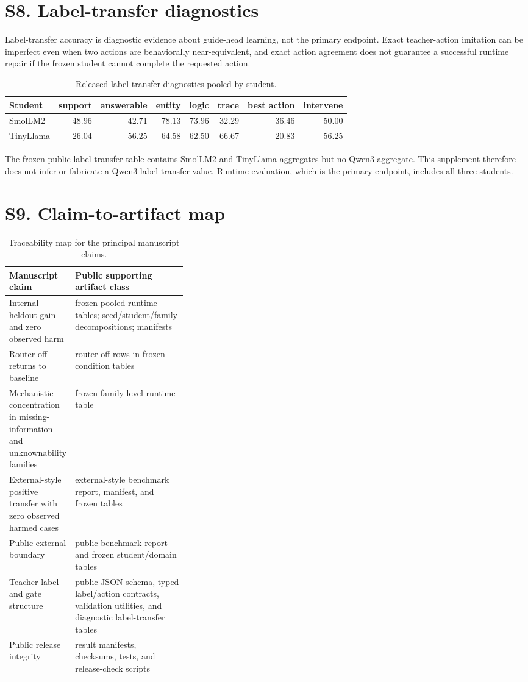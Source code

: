 \documentclass[11pt]{article}
\begin{document}
\section*{S8. Label-transfer diagnostics}
Label-transfer accuracy is diagnostic evidence about guide-head learning, not the primary endpoint. Exact teacher-action imitation can be imperfect even when two actions are behaviorally near-equivalent, and exact action agreement does not guarantee a successful runtime repair if the frozen student cannot complete the requested action.

\begin{table}[H]
\centering
\small
\caption{Released label-transfer diagnostics pooled by student.}
\begin{tabular}{lrrrrrrr}
\toprule
Student & support & answerable & entity & logic & trace & best action & intervene \\
\midrule
SmolLM2 & 48.96 & 42.71 & 78.13 & 73.96 & 32.29 & 36.46 & 50.00 \\
TinyLlama & 26.04 & 56.25 & 64.58 & 62.50 & 66.67 & 20.83 & 56.25 \\
\bottomrule
\end{tabular}
\end{table}

The frozen public label-transfer table contains SmolLM2 and TinyLlama aggregates but no Qwen3 aggregate. This supplement therefore does not infer or fabricate a Qwen3 label-transfer value. Runtime evaluation, which is the primary endpoint, includes all three students.

\section*{S9. Claim-to-artifact map}
\begin{table}[H]
\centering
\small
\caption{Traceability map for the principal manuscript claims.}
\begin{tabularx}{\linewidth}{p{0.34\linewidth}Y}
\toprule
Manuscript claim & Public supporting artifact class \\
\midrule
Internal heldout gain and zero observed harm & frozen pooled runtime tables; seed/student/family decompositions; manifests \\
Router-off returns to baseline & router-off rows in frozen condition tables \\
Mechanistic concentration in missing-information and unknownability families & frozen family-level runtime table \\
External-style positive transfer with zero observed harmed cases & external-style benchmark report, manifest, and frozen tables \\
Public external boundary & public benchmark report and frozen student/domain tables \\
Teacher-label and gate structure & public JSON schema, typed label/action contracts, validation utilities, and diagnostic label-transfer tables \\
Public release integrity & result manifests, checksums, tests, and release-check scripts \\
\bottomrule
\end{tabularx}
\end{table}
\end{document}
